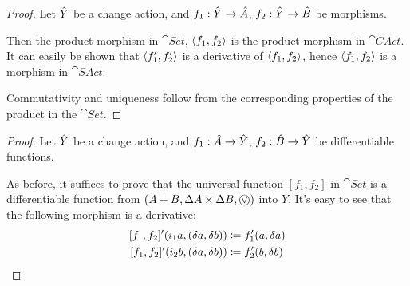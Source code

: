 \products*
\begin{proof}
  \label{prf:products}
  Let $\hat{Y}$ be a change action, and $f_1: \hat{Y} \rightarrow \hat{A}$, $f_2: \hat{Y}
  \rightarrow \hat{B}$ be morphisms.

  Then the product morphism in $\cat{Set}$, $\left\langle {f_1}, {f_2} \right\rangle$ is the product
  morphism in $\cat{CAct}$. It can easily be
  shown that $\left\langle {f_1'}, {f_2'} \right\rangle$ is a derivative of $\left\langle {f_1}, {f_2} \right\rangle$,
  hence $\left\langle {f_1}, {f_2} \right\rangle$ is a morphism in $\cat{SAct}$.

  Commutativity and uniqueness follow from the corresponding properties of the
  product in the $\cat{Set}$.
\end{proof}

\coproducts*
\begin{proof}
  \label{prf:coproducts}
  Let $\hat{Y}$ be a change action, and $f_1 : \hat{A} \rightarrow \hat{Y}$, $f_2 : \hat{B}
  \rightarrow \hat{Y}$ be differentiable functions.

  As before, it suffices to prove that the universal function $[f_1, f_2]$ in $\cat{Set}$ is a differentiable
  function from $\cstruct{A + B}{\changes{A} \times \changes{B}}{\cplusvee}$ into $Y$. It's easy to see
  that the following morphism is a derivative:
  \begin{align*}
    \derive{[f_1, f_2]} (i_1 a, (\change{a}, \change{b})) &\defeq f_1'(a, \change{a})\\
    \derive{[f_1, f_2]} (i_2 b, (\change{a}, \change{b})) &\defeq f_2'(b, \change{b})
  \end{align*}
\end{proof}


